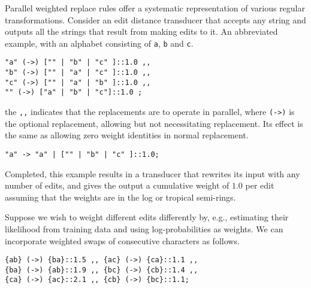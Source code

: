 \documentclass{llncs}
\begin{document}
Parallel weighted replace rules offer a systematic representation of various
regular transformations. Consider an edit distance transducer that accepts
any string and outputs all the strings that result from making edits
to it. An abbreviated example, with an alphabet consisting of {\tt a}, {\tt b} and {\tt c}.

\begin{center}
\begin{framed}
\begin{verbatim}
"a" (->) ["" | "b" | "c" ]::1.0 ,,
"b" (->) ["" | "a" | "c" ]::1.0 ,,
"c" (->) ["" | "a" | "b" ]::1.0 ,,
"" (->) ["a" | "b" | "c"]::1.0 ;
\end{verbatim}
\end{framed}
\end{center}

\noindent the \verb+,,+ indicates that the replacements are to operate
in parallel, where \verb+(->)+ is the optional replacement, allowing but not
necessitating replacement. Its effect is the same as allowing zero weight identities
in normal replacement.

\begin{center}
\begin{framed}
\begin{verbatim}
"a" -> "a" | ["" | "b" | "c" ]::1.0;
\end{verbatim}
\end{framed}
\end{center}

\noindent Completed, this example results in a transducer that rewrites
its input with any number of edits, and gives the output a cumulative weight of
$1.0$ per edit assuming that the weights are in the log or tropical
semi-rings.

Suppose we wish to weight different edits differently by, e.g., 
estimating their likelihood from training data and using log-probabilities as weights. 
We can incorporate weighted swaps of consecutive characters as follows.

\begin{center}
\begin{framed}
\begin{verbatim}
{ab} (->) {ba}::1.5 ,, {ac} (->) {ca}::1.1 ,,
{ba} (->) {ab}::1.9 ,, {bc} (->) {cb}::1.4 ,,
{ca} (->) {ac}::2.1 ,, {cb} (->) {bc}::1.1;
\end{verbatim}
\end{framed}
\end{center}
\end{document}
